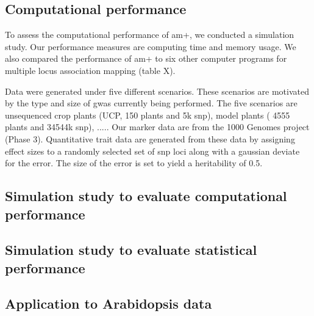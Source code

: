 \documentclass[12pt]{article}
\begin{document}
\subsection{Computational performance}

To assess the computational performance of am+, we conducted a simulation study. Our performance measures are computing time and memory usage. We also compared the performance of am+ to six other computer programs for multiple locus association mapping (table X). 

Data were generated under five different scenarios. These scenarios are motivated by the type and size of gwas currently being performed. The five scenarios are  unsequenced crop plants (UCP, 150 plants and 5k snp), model plants ( 4555 plants and 34544k snp), ..... Our marker data are from the 1000 Genomes project (Phase 3). Quantitative trait data are generated from these data by assigning effect sizes to a randomly selected set of snp loci along with a gaussian deviate for the error. 
The size of the error is  set to yield a heritability of 0.5.


\subsection{Simulation study to evaluate computational performance}

\subsection{Simulation study to evaluate statistical performance}

\subsection{Application to Arabidopsis data}
\end{document}
